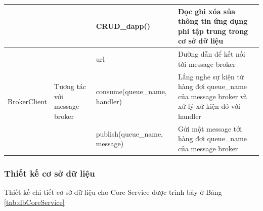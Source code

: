 \documentclass[../DoAn.tex]{subfiles}
\begin{document}
\begin{longtable}{|p{}|p{}|p{}|p{}|}
                                                 &                                                                                  & \hspace{0pt}CRUD\_dapp\hspace{0pt}()                                              & Đọc ghi xóa sủa thông tin ứng dụng phi tập trung trong cơ sở dữ liệu                         \\ \hline
    \multirow[t]{3}{0.2\textwidth}{BrokerClient} & \multirow[t]{3}{0.2\textwidth}{Tương tác với message broker}                     & \hspace{0pt}url                                                                   & Đường dẫn để kết nối tới message broker                                                      \\ \cline{3-4}
                                                 &                                                                                  & \hspace{0pt}consume\hspace{0pt}(queue\_name, handler)                             & Lắng nghe sự kiện từ hàng đợi queue\_name của message broker và xử lý xử kiện đó với handler \\ \cline{3-4}
                                                 &                                                                                  & \hspace{0pt}publish\hspace{0pt}(queue\_name, message)                             & Gửi một message tới hàng đợi queue\_name của message broker                                  \\ \hline
\end{longtable}

\subsubsection{Thiết kế cơ sở dữ liệu}

Thiết kế chi tiết cơ sở dữ liệu cho Core Service được trình bày ở Bảng
\ref{tab:dbCoreService}

\end{document}
